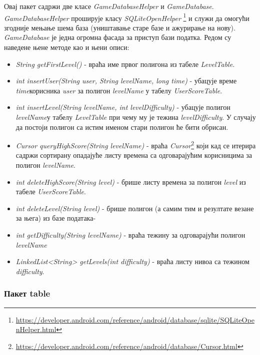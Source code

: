 Овај пакет садржи две класе \emph{GameDatabaseHelper} и \emph{GameDatabase}.  \emph{GameDatabaseHelper} проширује класу \emph{SQLiteOpenHelper} \footnote{\url{https://developer.android.com/reference/android/database/sqlite/SQLiteOpenHelper.html}} и служи да омогући згодније мењање шема база (уништавање старе базе и ажурирање на нову).
\\ \indent
 \emph{GameDatabase} је једна огромна фасада за приступ бази податка. 
Редом су наведене њене методе као и њени описи:
\begin{itemize}
\item \emph{String getFirstLevel()} - враћа име првог полигона из табеле \emph{LevelTable}.
\item \emph{int insertUser(String user, String levelName, long time)} - убацује време \emph{time}корисника \emph{user} за полигон \emph{levelName} у табелу \emph{UserScoreTable}.
\item \emph{int insertLevel(String levelName, int levelDifficulty)} - убацује полигон \emph{levelName}у табелу \emph{LevelTable} при чему му је тежина \emph{levelDifficulty}. У случају да постоји полигон са истим именом стари полигон ће бити обрисан.
\item \emph{Cursor queryHighScore(String levelName)} - враћа \emph{Cursor}\footnote{\url{https://developer.android.com/reference/android/database/Cursor.html}} који кад се итерира садржи сортирану опадајуће листу времена са одговарајућим корисницима за полигон \emph{levelName}.
\item \emph{int deleteHighScore(String level)} - брише листу времена за полигон \emph{level} из табеле \emph{UserScoreTable}.
\item \emph{int deleteLevel(String level)} - брише полигон (а самим тим и резултате везане за њега) из базе података-
\item \emph{int getDifficulty(String levelName)} - враћа тежину за одговарајући полигон \emph{levelName}
\item \emph{LinkedList<String> getLevels(int difficulty)} - враћа листу  нивоа са тежином \emph{difficulty}.
\end{itemize}

\subsubsection{Пакет table}

